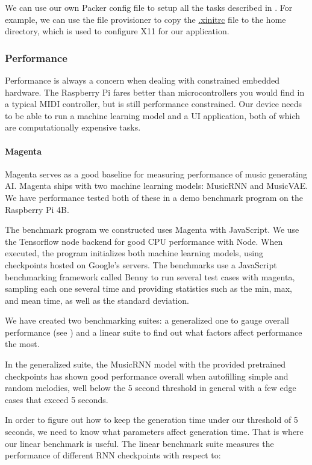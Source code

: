 We can use our own Packer config file to setup all the tasks described in
. For example, we can use the file provisioner to
copy the \url{.xinitrc} file to the home directory, which is used to configure X11 for our
application.

\subsubsection{Performance}

Performance is always a concern when dealing with constrained embedded hardware. The
Raspberry Pi fares better than microcontrollers you would find in a typical MIDI
controller, but is still performance constrained. Our device needs to be able to run a
machine learning model and a UI application, both of which are computationally expensive
tasks.

\paragraph{Magenta}

Magenta serves as a good baseline for measuring performance of music generating AI.
Magenta ships with two machine learning models: MusicRNN and MusicVAE. We have performance
tested both of these in a demo benchmark program on the Raspberry Pi 4B.

The benchmark program we constructed uses Magenta with JavaScript. We use the Tensorflow
node backend for good CPU performance with Node. When executed, the program initializes
both machine learning models, using checkpoints hosted on Google's servers. The benchmarks
use a JavaScript benchmarking framework called Benny to run several test cases with
magenta, sampling each one several time and providing statistics such as the min, max,
and mean time, as well as the standard deviation.

We have created two benchmarking suites: a generalized one to gauge overall performance
(see ) and a linear suite to find out what factors
affect performance the most.

In the generalized suite, the MusicRNN model with the provided pretrained checkpoints has
shown good performance overall when autofilling simple and random melodies, well below the
5 second threshold in general with a few edge cases that exceed 5 seconds.

In order to figure out how to keep the generation time under our threshold of 5 seconds,
we need to know what parameters affect generation time. That is where our linear benchmark
is useful. The linear benchmark suite measures the performance of different RNN
checkpoints with respect to:

